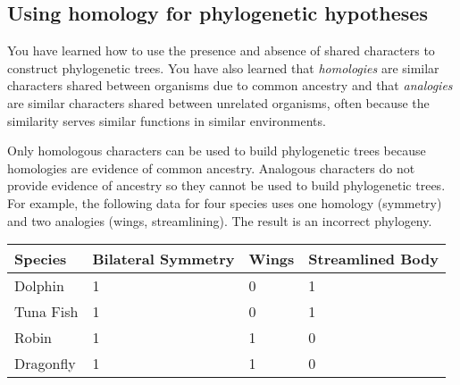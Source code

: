 \documentclass[12pt, hidelinks]{exam}
\begin{document}
\subsection*{Using homology for phylogenetic hypotheses}

You have learned how to use the presence and absence of shared
characters to construct phylogenetic trees. You have also learned that \emph{homologies}
are similar characters shared between organisms due to common ancestry and that
\emph{analogies} are similar characters shared between unrelated organisms, 
often because the similarity serves similar functions in similar environments.

Only homologous characters can be used to build phylogenetic trees because 
homologies are evidence of common ancestry. Analogous characters do not provide 
evidence of ancestry so they cannot be used to build phylogenetic trees. For example, 
the following data for four species uses one homology (symmetry) and two analogies (wings, 
streamlining). The result is an incorrect phylogeny.

\bigskip

\begin{center}

	\begin{tabular}{lC{0.8in}C{0.6in}C{0.8in}}
		\toprule
		Species	& Bilateral Symmetry	&	Wings	&	Streamlined Body \tabularnewline
		\midrule
		Dolphin 	&	1						&	0					&	1	\tabularnewline 
		Tuna Fish	&	1						&	0					&	1	\tabularnewline
		Robin		&	1						&	1					&	0	\tabularnewline
		Dragonfly	&	1						&	1					&	0	\tabularnewline
		\bottomrule
	\end{tabular}

\bigskip


\end{center}
\end{document}
